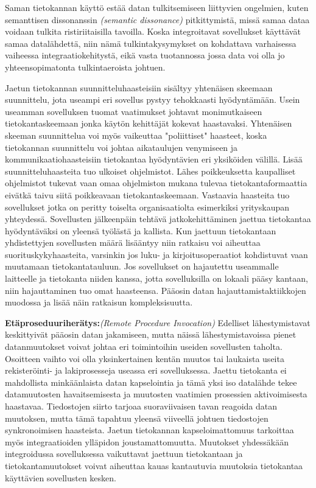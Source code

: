 Saman tietokannan käyttö estää datan tulkitsemiseen liittyvien ongelmien, kuten semanttisen dissonanssin \textit{(semantic dissonance)} pitkittymistä, missä samaa dataa voidaan tulkita ristiriitaisilla tavoilla. Koska integroitavat sovellukset käyttävät samaa datalähdettä, niin nämä tulkintakysymykset on kohdattava varhaisessa vaiheessa integraatiokehitystä, eikä vasta tuotannossa jossa data voi olla jo yhteensopimatonta tulkintaeroista johtuen. 


Jaetun tietokannan suunnitteluhaasteisiin sisältyy yhtenäisen skeemaan suunnittelu, jota useampi eri sovellus pystyy tehokkaasti hyödyntämään. Usein useamman sovelluksen tuomat vaatimukset johtavat monimutkaiseen tietokantaskeemaan jonka käytön kehittäjät kokevat haastavaksi. Yhtenäisen skeeman suunnittelua voi myös vaikeuttaa "poliittiset" haasteet, koska tietokannan suunnittelu voi johtaa aikataulujen venymiseen ja kommunikaatiohaasteisiin tietokantaa hyödyntävien eri yksiköiden välillä.
Lisää suunnitteluhaasteita tuo ulkoiset ohjelmistot. Lähes poikkeuksetta kaupalliset ohjelmistot tukevat vaan omaa ohjelmiston mukana tulevaa tietokantaformaattia eivätkä taivu siitä poikkeavaan tietokantaskeemaan. Vastaavia haasteita tuo sovellukset jotka on peritty toiselta organisaatiolta esimerkiksi yrityskaupan yhteydessä. Sovellusten jälkeenpäin tehtävä jatkokehittäminen jaettua tietokantaa hyödyntäväksi on yleensä työlästä ja kallista.
Kun jaettuun tietokantaan yhdistettyjen sovellusten määrä lisääntyy niin ratkaisu voi aiheuttaa suorituskykyhaasteita, varsinkin jos luku- ja kirjoitusoperaatiot kohdistuvat vaan muutamaan tietokantatauluun. Jos sovellukset on hajautettu useammalle laitteelle ja tietokanta niiden kanssa, jotta sovelluksilla on lokaali pääsy kantaan, niin hajauttaminen tuo omat haasteensa. Pääosin datan hajauttamistaktiikkojen muodossa ja lisää näin ratkaisun kompleksisuutta.

\textbf{Etäproseduuriherätys:}\textit{(Remote Procedure Invocation)} Edelliset lähestymistavat keskittyivät pääosin datan jakamiseen, mutta näissä lähestymistavoissa pienet datanmuutokset voivat johtaa eri toimintoihin useiden sovellusten taholta. Osoitteen vaihto voi olla yksinkertainen kentän muutos tai laukaista useita rekisteröinti- ja lakiprosesseja useassa eri sovelluksessa. Jaettu tietokanta ei mahdollista minkäänlaista datan kapselointia ja tämä yksi iso datalähde tekee datamuutosten havaitsemisesta ja muutosten vaatimien prosessien aktivoimisesta haastavaa. Tiedostojen siirto tarjoaa suoraviivaisen tavan reagoida datan muutoksen, mutta tämä tapahtuu yleensä viiveellä johtuen tiedostojen synkronoimisen haasteista.
Jaetun tietokannan kapseloimattomuus tarkoittaa myös integraatioiden ylläpidon joustamattomuutta. Muutokset yhdessäkään integroidussa sovelluksessa vaikuttavat jaettuun tietokantaan ja tietokantamuutokset voivat aiheuttaa kauas kantautuvia muutoksia tietokantaa käyttävien sovellusten kesken.

